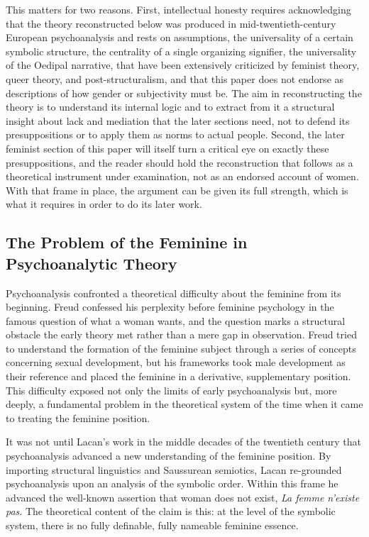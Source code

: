 This matters for two reasons. First, intellectual honesty requires acknowledging that the theory reconstructed below was produced in mid-twentieth-century European psychoanalysis and rests on assumptions, the universality of a certain symbolic structure, the centrality of a single organizing signifier, the universality of the Oedipal narrative, that have been extensively criticized by feminist theory, queer theory, and post-structuralism, and that this paper does not endorse as descriptions of how gender or subjectivity must be. The aim in reconstructing the theory is to understand its internal logic and to extract from it a structural insight about lack and mediation that the later sections need, not to defend its presuppositions or to apply them as norms to actual people. Second, the later feminist section of this paper will itself turn a critical eye on exactly these presuppositions, and the reader should hold the reconstruction that follows as a theoretical instrument under examination, not as an endorsed account of women. With that frame in place, the argument can be given its full strength, which is what it requires in order to do its later work.

\subsection{The Problem of the Feminine in Psychoanalytic Theory}

Psychoanalysis confronted a theoretical difficulty about the feminine from its beginning. Freud confessed his perplexity before feminine psychology in the famous question of what a woman wants, and the question marks a structural obstacle the early theory met rather than a mere gap in observation. Freud tried to understand the formation of the feminine subject through a series of concepts concerning sexual development, but his frameworks took male development as their reference and placed the feminine in a derivative, supplementary position. This difficulty exposed not only the limits of early psychoanalysis but, more deeply, a fundamental problem in the theoretical system of the time when it came to treating the feminine position.

It was not until Lacan's work in the middle decades of the twentieth century that psychoanalysis advanced a new understanding of the feminine position. By importing structural linguistics and Saussurean semiotics, Lacan re-grounded psychoanalysis upon an analysis of the symbolic order. Within this frame he advanced the well-known assertion that woman does not exist, \textit{La femme n'existe pas}. The theoretical content of the claim is this: at the level of the symbolic system, there is no fully definable, fully nameable feminine essence.

